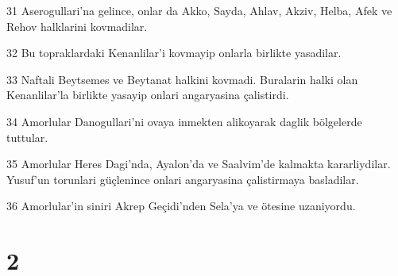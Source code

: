 \par 31 Aserogullari'na gelince, onlar da Akko, Sayda, Ahlav, Akziv, Helba, Afek ve Rehov halklarini kovmadilar.
\par 32 Bu topraklardaki Kenanlilar'i kovmayip onlarla birlikte yasadilar.
\par 33 Naftali Beytsemes ve Beytanat halkini kovmadi. Buralarin halki olan Kenanlilar'la birlikte yasayip onlari angaryasina çalistirdi.
\par 34 Amorlular Danogullari'ni ovaya inmekten alikoyarak daglik bölgelerde tuttular.
\par 35 Amorlular Heres Dagi'nda, Ayalon'da ve Saalvim'de kalmakta kararliydilar. Yusuf'un torunlari güçlenince onlari angaryasina çalistirmaya basladilar.
\par 36 Amorlular'in siniri Akrep Geçidi'nden Sela'ya ve ötesine uzaniyordu.

\chapter{2}

